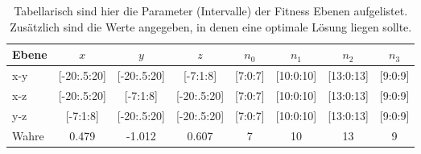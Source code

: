 %
\begin{table} [h]
	\begin{center}
		\begin{tabular}{lccccccc}
		\textbf{Ebene} & \textbf{$x$} & \textbf{$y$} & \textbf{$z$} & \textbf{$n_0$} & \textbf{$n_1$}& \textbf{$n_2$} & \textbf{$n_3$} \\
			\hline
			x-y & [-20:.5:20]		& [-20:.5:20]	& [-7:1:8] & [7:0:7] & [10:0:10]& [13:0:13]&[9:0:9]   \\
			x-z & [-20:.5:20] 	& [-7:1:8] 	& [-20:.5:20] & [7:0:7] & [10:0:10]& [13:0:13]&[9:0:9] \\
			y-z & [-7:1:8]  	& [-20:.5:20]	& [-20:.5:20] & [7:0:7] & [10:0:10]& [13:0:13]&[9:0:9]\\
			\hline
			Wahre & 0.479 & -1.012 & 0.607 & 7  & 10 & 13 & 9			\\
%
		\end{tabular}
		\caption[Parameter der Fitness Ebenen]{Tabellarisch sind hier die Parameter (Intervalle) der Fitness Ebenen aufgelistet. Zusätzlich sind die Werte angegeben, in denen eine optimale Lösung liegen sollte. }
		\label{tab:complexity1}
	\end{center}
\end{table}